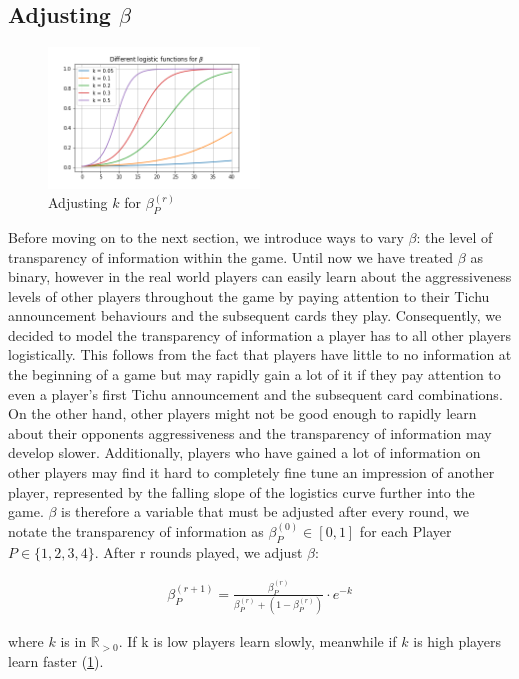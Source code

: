 \subsection{Adjusting $\beta$}
\begin{figure}[h!]
    \centering
    \includegraphics[width=0.5\textwidth]{Bilder/5_log}
    \caption{Adjusting $k$ for $\beta^{(r)}_{P}$}
    \label{fig:14}
\end{figure}
Before moving on to the next section, we introduce ways to vary $\beta$: the level of transparency of information within the game. Until now we have treated $\beta$ as binary, however in the real world players can easily learn about the aggressiveness levels of other players throughout the game by paying attention to their Tichu announcement behaviours and the subsequent cards they play. Consequently, we decided to model the transparency of information a player has to all other players logistically. This follows from the fact that players have little to no information at the beginning of a game but may rapidly gain a lot of it if they pay attention to even a player’s first Tichu announcement and the subsequent card combinations. On the other hand, other players might not be good enough to rapidly learn about their opponents aggressiveness and the transparency of information may develop slower. Additionally, players who have gained a lot of information on other players may find it hard to completely fine tune an impression of another player, represented by the falling slope of the logistics curve further into the game. $\beta$ is therefore a variable that must be adjusted after every round, we notate the transparency of information as $\beta^{(0)}_{P}\in[0,1]$ for each Player $P\in\{1,2,3,4\}$. After r rounds played, we adjust $\beta$:

\begin{align*}
\beta^{(r+1)}_{P} = \frac{\beta^{(r)}_{P}
}{\beta^{(r)}_{P} + (1 - \beta^{(r)}_{P})} \cdot e^{-k}
\end{align*}

where $k$ is in $\mathbb{R}_{>0}$. If k is low players learn slowly, meanwhile if $k$ is high players learn faster (\ref{fig:14}).

